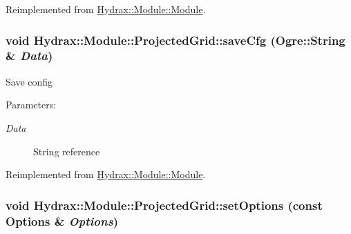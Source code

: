 Reimplemented from \hyperlink{class_hydrax_1_1_module_1_1_module_21f60a53a99d72ff00d3fe5565518165}{Hydrax::Module::Module}.\hypertarget{class_hydrax_1_1_module_1_1_projected_grid_4502387739439e0d6cca1f006fc4a28c}{
\subsubsection[{saveCfg}]{\setlength{\rightskip}{0pt plus 5cm}void Hydrax::Module::ProjectedGrid::saveCfg (Ogre::String \& {\em Data})}}
\label{class_hydrax_1_1_module_1_1_projected_grid_4502387739439e0d6cca1f006fc4a28c}


Save config \begin{Desc}
\item[Parameters:]
\begin{description}
\item[{\em Data}]String reference \end{description}
\end{Desc}


Reimplemented from \hyperlink{class_hydrax_1_1_module_1_1_module_998a5baf42f57b02ca7bc20bc12f95a9}{Hydrax::Module::Module}.\hypertarget{class_hydrax_1_1_module_1_1_projected_grid_04d04b9cfc173538038a5f51094c1ffa}{
\subsubsection[{setOptions}]{\setlength{\rightskip}{0pt plus 5cm}void Hydrax::Module::ProjectedGrid::setOptions (const {\bf Options} \& {\em Options})}}
\label{class_hydrax_1_1_module_1_1_projected_grid_04d04b9cfc173538038a5f51094c1ffa}


